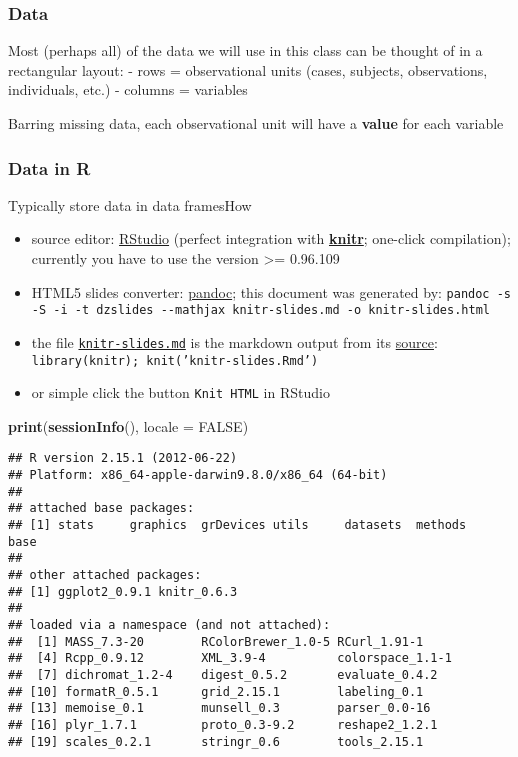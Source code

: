 \documentclass[ignorenonframetext,]{beamer}
\newenvironment{Shaded}{}{}
\newcommand{\KeywordTok}[1]{\textcolor[rgb]{0.00,0.44,0.13}{\textbf{{#1}}}}
\newcommand{\DataTypeTok}[1]{\textcolor[rgb]{0.56,0.13,0.00}{{#1}}}
\newcommand{\OtherTok}[1]{\textcolor[rgb]{0.00,0.44,0.13}{{#1}}}
\newcommand{\NormalTok}[1]{{#1}}
\begin{document}
\begin{frame}\frametitle{Data}

Most (perhaps all) of the data we will use in this class can be thought
of in a rectangular layout: - rows = observational units (cases,
subjects, observations, individuals, etc.) - columns = variables

Barring missing data, each observational unit will have a \textbf{value}
for each variable

\end{frame}

\begin{frame}[fragile]\frametitle{Data in R}

Typically store data in data framesHow

\begin{itemize}[<+->]
\item
  source editor: \href{http://www.rstudio.org/}{RStudio} (perfect
  integration with \href{http://yihui.name/knitr/}{\textbf{knitr}};
  one-click compilation); currently you have to use the version
  \textgreater{}= 0.96.109
\item
  HTML5 slides converter:
  \href{http://johnmacfarlane.net/pandoc/}{pandoc}; this document was
  generated by:
  \texttt{pandoc -s -S -i -t dzslides -{}-mathjax knitr-slides.md -o knitr-slides.html}
\item
  the file
  \href{https://github.com/yihui/knitr-examples/blob/master/009-slides.md}{\texttt{knitr-slides.md}}
  is the markdown output from its
  \href{https://github.com/yihui/knitr-examples/blob/master/009-slides.Rmd}{source}:
  \texttt{library(knitr); knit('knitr-slides.Rmd')}
\item
  or simple click the button \texttt{Knit HTML} in RStudio
\end{itemize}

\begin{Shaded}
\begin{Highlighting}[]
\KeywordTok{print}\NormalTok{(}\KeywordTok{sessionInfo}\NormalTok{(), }\DataTypeTok{locale =} \OtherTok{FALSE}\NormalTok{)}
\end{Highlighting}
\end{Shaded}

\begin{verbatim}
## R version 2.15.1 (2012-06-22)
## Platform: x86_64-apple-darwin9.8.0/x86_64 (64-bit)
## 
## attached base packages:
## [1] stats     graphics  grDevices utils     datasets  methods   base     
## 
## other attached packages:
## [1] ggplot2_0.9.1 knitr_0.6.3  
## 
## loaded via a namespace (and not attached):
##  [1] MASS_7.3-20        RColorBrewer_1.0-5 RCurl_1.91-1      
##  [4] Rcpp_0.9.12        XML_3.9-4          colorspace_1.1-1  
##  [7] dichromat_1.2-4    digest_0.5.2       evaluate_0.4.2    
## [10] formatR_0.5.1      grid_2.15.1        labeling_0.1      
## [13] memoise_0.1        munsell_0.3        parser_0.0-16     
## [16] plyr_1.7.1         proto_0.3-9.2      reshape2_1.2.1    
## [19] scales_0.2.1       stringr_0.6        tools_2.15.1      
\end{verbatim}

\end{frame}
\end{document}
